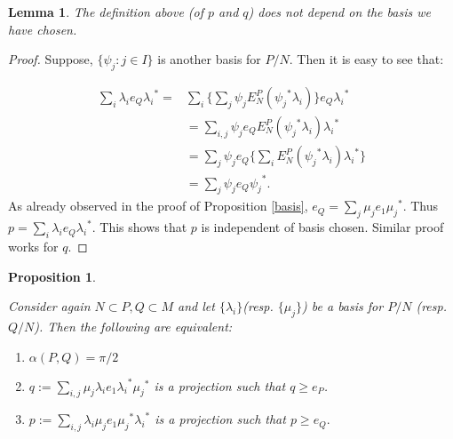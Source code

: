 \documentclass[11pt,letterpaper]{amsart}
\newtheorem{proposition}[theorem]{Proposition}
\newtheorem{lemma}[theorem]{Lemma}
\theoremstyle{definition}
\theoremstyle{remark}
\begin{document}
\begin{lemma}\label{independent}
The definition above (of $p$ and $q$) does not depend on the basis we have chosen.
 \end{lemma}
 \begin{proof}
  Suppose, $\{\psi_j:j\in I\}$ is another basis for $P/N$. Then it is easy to see that:
  
  \begin{align*}
   \sum_i \lambda_i e_Q {\lambda_i}^*= & \sum_{i} \{\sum_j \psi_j E^P_N({\psi_j}^*\lambda_i)\}e_Q{\lambda_i}^*\\
   &= \sum_{i,j}\psi_je_QE^P_N({\psi_j}^*\lambda_i){\lambda_i}^*\\
   & = \sum_j \psi_je_Q\{\sum_i  E^P_N({\psi_j}^*\lambda_i){\lambda_i}^*\}\\
   &= \sum_j \psi_j e_Q{\psi_j}^*.
  \end{align*}
  As already observed in the proof of Proposition \ref{basis},
 $e_Q= \sum_j \mu_j e_1 {{\mu}_j}^*$. Thus $p= \sum_i \lambda_i e_Q {\lambda_i}^*.$
This shows that $p$ is independent of basis chosen. Similar proof works for $q$.
 \end{proof}

\begin{proposition}\label{q}

 Consider again $N\subset P,Q\subset M$ and let $\{\lambda_i\}$(resp. $\{\mu_j\}$) be a basis for $P/N$ (resp. $Q/N$). Then the following are equivalent:
 \begin{enumerate}
 \item $\alpha(P,Q)= \pi/2$
 
 \item  $q:= \sum_{i,j}\mu_j \lambda_i e_1 {\lambda_i}^* {\mu_j}^*$ is a projection such that $q \geq e_P$.
  
 \item $p:= \sum_{i,j}{\lambda_i}\mu_j e_1 {\mu_j}^*{\lambda_i}^* $ is a projection such that $p\geq e_Q.$
\end{enumerate}
 \end{proposition}
 
\end{document}
